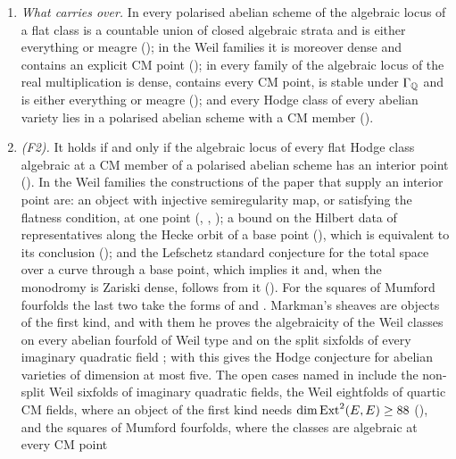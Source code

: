 \begin{theorem}\label{thm:twostand}
\leavevmode
\begin{enumerate}[label=\textup{(\roman*)},leftmargin=2.6em,itemsep=3pt]
\item \emph{What carries over.} In every polarised abelian scheme of
   the algebraic locus of a flat class is a
  countable union of closed algebraic strata and is either everything or
  meagre (); in the Weil families it is moreover dense
  and contains an explicit CM point (); in every family of
   the algebraic locus of the real multiplication is dense,
  contains every CM point, is stable under $\Gamma_{\mathbb{Q}}$ and is either
  everything or meagre (); and every Hodge class of every
  abelian variety lies in a polarised abelian scheme with a CM member
  ().
\item \emph{(F2).} It holds if and only if the algebraic locus of every flat
  Hodge class algebraic at a CM member of a polarised abelian scheme has an
  interior point (). In the Weil families the
  constructions of the paper that supply an interior point are: an object
  with injective semiregularity map, or satisfying the flatness condition,
  at one point (, ,
  ); a bound on the Hilbert data of representatives along
  the Hecke orbit of a base point (), which is
  equivalent to its conclusion (); and the Lefschetz
  standard conjecture for the total space over a curve through a base point,
  which implies it and, when the monodromy is Zariski dense, follows from it
  (). For the squares of Mumford fourfolds the last two
  take the forms of  and .
  Markman's sheaves are objects of the first kind, and with them he proves
  the algebraicity of the Weil classes on every abelian fourfold of Weil
  type and on the split sixfolds of every imaginary quadratic field
  \cite{Mar25a,Mar25b}; with \cite{MZ99} this gives the Hodge conjecture for
  abelian varieties of dimension at most five. The open cases named in
   include the non-split Weil sixfolds of imaginary
  quadratic fields, the Weil eightfolds of quartic CM fields, where an
  object of the first kind needs
  $\dim\operatorname{Ext}^{2}(E,E)\ge88$ (), and the squares of
  Mumford fourfolds, where the classes are algebraic at every CM point

\end{enumerate}
\end{theorem}
